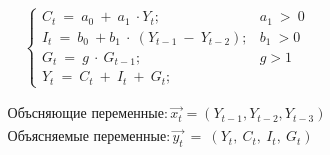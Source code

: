 \documentclass[12pt,a4paper]{article}
\begin{document}
\begin{equation*}
\begin{cases}
C_{t} \ =\ a_{0} \ +\ a_{1} \ \cdot Y_{t} ; & a_{1} \  >\ 0\\
I_{t} \ =\ b_{0} \ +b_{1} \ \cdot \ ( Y_{t-1} \ -\ Y_{t-2}) ; & b_{1} \  >0\\
G_{t} \ =\ g\ \cdot \ G_{t-1} ; & g >1\\
Y_{t} \ =\ C_{t} \ +\ I_{t} \ +\ G_{t} ; & 
\end{cases}
\end{equation*}

\begin{gather*}
\text{Объсняющие\ переменные}:\overrightarrow{x_{t}} =( Y_{t-1} ,Y_{t-2} ,Y_{t-3})\\
\text{Объясняемые\ переменные}:\overrightarrow{y_t} \ =\ ( Y_{t} ,\ C_{t} ,\ I_{t} ,\ G_{t})
\end{gather*}
\end{document}
